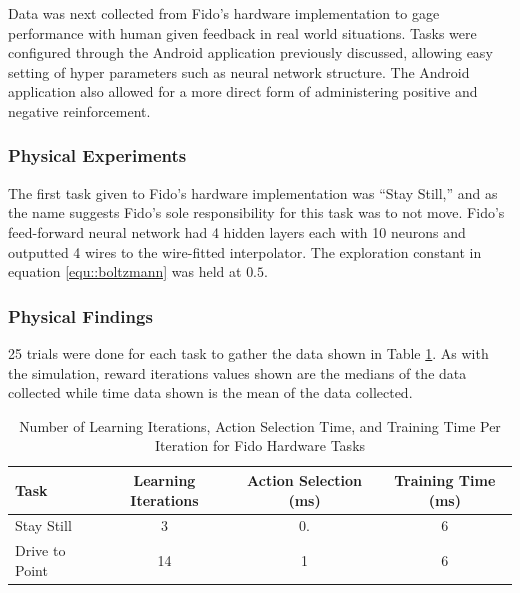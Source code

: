 Data was next collected from Fido's hardware implementation to gage performance with human given feedback in real world situations.  Tasks were configured through the Android application previously discussed, allowing easy setting of hyper parameters such as neural network structure.  The Android application also allowed for a more direct form of administering positive and negative reinforcement. 

\subsubsection{Physical Experiments}

The first task given to Fido's hardware implementation was ``Stay Still,'' and as the name suggests Fido's sole responsibility for this task was to not move.  Fido's feed-forward neural network had 4 hidden layers each with 10 neurons and outputted 4 wires to the wire-fitted interpolator. The exploration constant in equation \ref{equ::boltzmann} was held at $0.5$.

\subsubsection{Physical Findings}

25 trials were done for each task to gather the data shown in Table \ref{tab:data2}.  As with the simulation, reward iterations values shown are the medians of the data collected while time data shown is the mean of the data collected.

\begin{table}[ht]
	\centering
	\begin{tabular}{@{}lccc@{}}
		\toprule
		Task             & Learning Iterations & Action Selection (ms) & Training Time (ms) \\ \midrule
		Stay Still       & 3                   & 0.                    & 6                  \\
		Drive to Point   & 14                  & 1                     & 6                  \\
	\end{tabular}
	\caption{Number of Learning Iterations, Action Selection Time, and Training Time Per Iteration for Fido Hardware Tasks}
	\label{tab:data2}
\end{table}